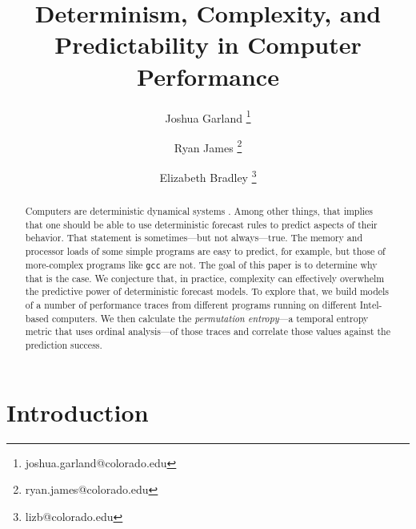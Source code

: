 \documentclass{article}
\title{Determinism, Complexity, and Predictability in Computer Performance}
\author[1]{Joshua Garland \thanks{joshua.garland@colorado.edu}}
\author[1]{Ryan James \thanks{ryan.james@colorado.edu}}
\author[1,2]{Elizabeth Bradley \thanks{lizb@colorado.edu}}
\affil[1]{Department of Computer Science \\
  University of Colorado at Boulder \\
  Colorado, USA
}
\affil[2]{Santa Fe Institute \\
  New Mexico, USA
}
\begin{document}
\maketitle





\begin{abstract}
  Computers are deterministic dynamical systems \cite{mytkowicz09}.
  Among other things, that implies that one should be able to use
  deterministic forecast rules to predict aspects of their behavior.
  That statement is sometimes---but not always---true. The memory and
  processor loads of some simple programs are easy to predict, for
  example, but those of more-complex programs like {\tt gcc} are not.
  The goal of this paper is to determine why that is the case. We
  conjecture that, in practice, complexity can effectively overwhelm
  the predictive power of deterministic forecast models. To explore
  that, we build models of a number of performance traces from
  different programs running on different Intel-based computers. We
  then calculate the \emph{permutation entropy}---a temporal entropy
  metric that uses ordinal analysis---of those traces and correlate
  those values against the prediction success.
\end{abstract}

\section{Introduction}
\end{document}
